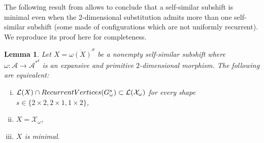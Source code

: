 \documentclass[12pt]{amsart}
\newtheorem{lemma}[definition]{Lemma}
\newcommand{\N}{\mathbb{N}}
\newcommand{\bn}{{\boldsymbol{n}}}
\newcommand{\Acal}{\mathcal{A}} %
\newcommand{\Lcal}{\mathcal{L}}
\newcommand{\Xcal}{\mathcal{X}} %
\newcommand{\shiftclosure}[1]{{\overline{#1}^{\sigma}}}
\newcommand{\shape}{\textsc{shape}}
\newcommand{\RecurrentVertices}{\textsc{RecurrentVertices}}
\newcommand{\ifnv}[2]{\ifthenelse{\equal{#1}{}}{}{#2}}
\newcommand\defn[2][]{\ifnv{#1}{\index{#1|\textbf}}{\index{#2|\textbf}}\textbf{#2}}
\begin{document}
    The following result from \cite{labbe_metallic_I_2024}
    allows to conclude that a self-similar subshift is minimal 
    even when the 2-dimensional substitution admits more than one self-similar
    subshift (some made of configurations which are not uniformly recurrent).
    We reproduce its proof here for completeness.

\begin{lemma}\label{lem:criterion-for-minimality}
    {\rm\cite[Lemma~10.4]{labbe_metallic_I_2024}}
    Let $X=\shiftclosure{\omega(X)}$ be a nonempty self-similar subshift
    where $\omega:\Acal\to\Acal^{*^d}$ is an expansive and primitive $2$-dimensional
    morphism.
    The following are equivalent:
    \begin{enumerate}[(i)]
        \item $\Lcal(X)\cap\RecurrentVertices(G^s_\omega)\subset\Lcal(\Xcal_\omega)$
              for every shape $s\in\{2\times2, 2\times1, 1\times2\}$,
    \item $X=\Xcal_\omega$,
    \item $X$ is minimal.
    \end{enumerate}
\end{lemma}

\end{document}
